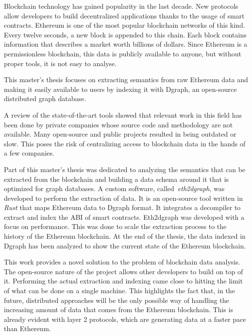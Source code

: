 Blockchain technology has gained popularity in the last decade. New protocols allow developers to build decentralized applications thanks to the usage of smart contracts. Ethereum is one of the most popular blockchain networks of this kind. Every twelve seconds, a new block is appended to this chain. Each block contains information that describes a market worth billions of dollars. Since Ethereum is a permissionless blockchain, this data is publicly available to anyone, but without proper tools, it is not easy to analyse.

This master's thesis focuses on extracting semantics from raw Ethereum data and making it easily available to users by indexing it with Dgraph, an open-source distributed graph database. 

A review of the state-of-the-art tools showed that relevant work in this field has been done by private companies whose source code and methodology are not available. Many open-source and public projects resulted in being outdated or slow. This poses the risk of centralizing access to blockchain data in the hands of a few companies.

Part of this master's thesis was dedicated to analyzing the semantics that can be extracted from the blockchain and building a data schema around it that is optimized for graph databases. A custom software, called~\textit{eth2dgraph}, was developed to perform the extraction of data. It is an open-source tool written in \textit{Rust} that maps Ethereum data to Dgraph format. It integrates a decompiler to extract and index the ABI of smart contracts. Eth2dgraph was developed with a focus on performance. This was done to scale the extraction process to the history of the Ethereum blockchain. At the end of the thesis, the data indexed in Dgraph has been analyzed to show the current state of the Ethereum blockchain.

This work provides a novel solution to the problem of blockchain data analysis. The open-source nature of the project allows other developers to build on top of it. Performing the actual extraction and indexing came close to hitting the limit of what can be done on a single machine. This highlights the fact that, in the future, distributed approaches will be the only possible way of handling the increasing amount of data that comes from the Ethereum blockchain. This is already evident with layer 2 protocols, which are generating data at a faster pace than Ethereum.

